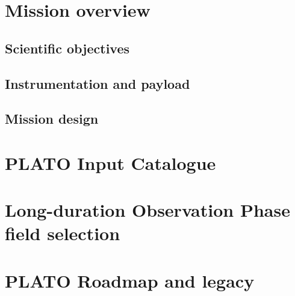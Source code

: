 \section{Mission overview}



\subsection{Scientific objectives}
\subsection{Instrumentation and payload}  
\subsection{Mission design}
\section{PLATO Input Catalogue}
\parencite{Montalto_2021}
\section{Long-duration Observation Phase field selection}

\parencite{Nascimbeni_2022}

\section{PLATO Roadmap and legacy}